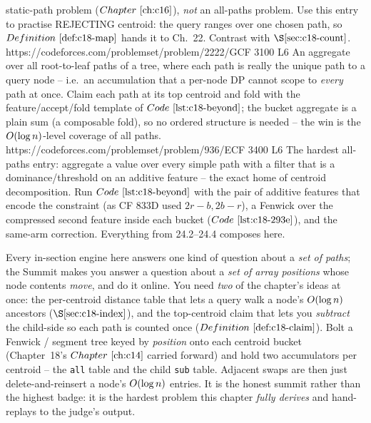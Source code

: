 \begin{mixedset}
{     static-path problem (\(\chref{c16}\)), \emph{not} an all-paths problem. Use this entry to
     practise REJECTING centroid: the query ranges over one chosen path, so \(\defref{c18-map}\)
     hands it to Ch.~22. Contrast with \(\secref{c18-count}\).}
    {https://codeforces.com/problemset/problem/2222/G}{CF 3100 L6}
    {An aggregate over all root-to-leaf paths of a tree, where each path is really the unique path to
     a query node -- i.e.\ an accumulation that a per-node DP cannot scope to \emph{every} path at
     once. Claim each path at its top centroid and fold with the feature/accept/fold template of
     \(\coderef{c18-beyond}\); the bucket aggregate is a plain sum (a composable fold), so no ordered
     structure is needed -- the win is the \(O(\log n)\)-level coverage of all paths.}
    {https://codeforces.com/problemset/problem/936/E}{CF 3400 L6}
    {The hardest all-paths entry: aggregate a value over every simple path with a filter that is a
     dominance/threshold on an additive feature -- the exact home of centroid decomposition. Run
     \(\coderef{c18-beyond}\) with the pair of additive features that encode the constraint (as CF
     833D used \(2r-b,2b-r\)), a Fenwick over the compressed second feature inside each bucket
     (\(\coderef{c18-293e}\)), and the same-arm correction. Everything from 24.2--24.4 composes here.}
\end{mixedset}



\begin{notebox}
Every in-section engine here answers one kind of question about a \emph{set of paths}; the Summit
makes you answer a question about a \emph{set of array positions} whose node contents \emph{move},
and do it online. You need \emph{two} of the chapter's ideas at once: the per-centroid distance
table that lets a query walk a node's \(O(\log n)\) ancestors (\(\secref{c18-index}\)), and the
top-centroid claim that lets you \emph{subtract} the child-side so each path is counted once
(\(\defref{c18-claim}\)). Bolt a Fenwick / segment tree keyed by \emph{position} onto each centroid
bucket (Chapter~18's \(\chref{c14}\) carried forward) and hold two accumulators per centroid -- the
\texttt{all} table and the child \texttt{sub} table. Adjacent swaps are then just delete-and-reinsert
a node's \(O(\log n)\) entries. It is the honest summit rather than the highest badge: it is the
hardest problem this chapter \emph{fully derives} and hand-replays to the judge's output.
\end{notebox}

